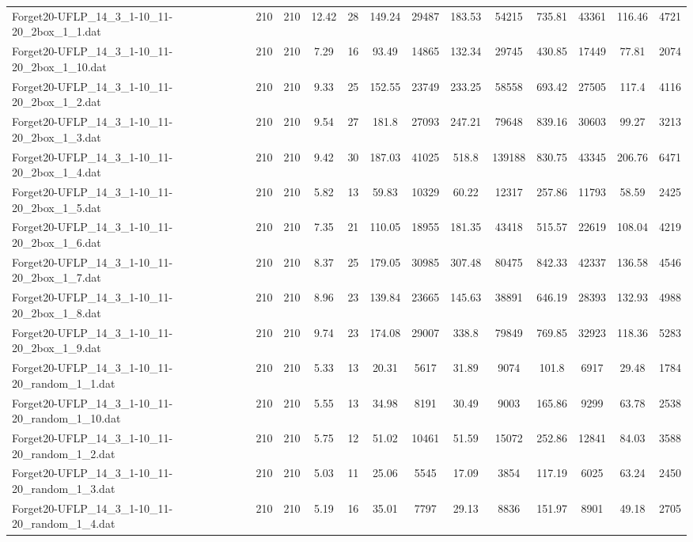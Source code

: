 \begin{table}[!ht]
{\begin{tabular}{lcccccccccccc}
Forget20-UFLP\_14\_3\_1-10\_11-20\_2box\_1\_1.dat & 210 & 210 & 12.42 & 28 & 149.24 & 29487 & 183.53 & 54215 & 735.81 & 43361 & 116.46 & 4721 \\
Forget20-UFLP\_14\_3\_1-10\_11-20\_2box\_1\_10.dat & 210 & 210 & 7.29 & 16 & 93.49 & 14865 & 132.34 & 29745 & 430.85 & 17449 & 77.81 & 2074 \\
Forget20-UFLP\_14\_3\_1-10\_11-20\_2box\_1\_2.dat & 210 & 210 & 9.33 & 25 & 152.55 & 23749 & 233.25 & 58558 & 693.42 & 27505 & 117.4 & 4116 \\
Forget20-UFLP\_14\_3\_1-10\_11-20\_2box\_1\_3.dat & 210 & 210 & 9.54 & 27 & 181.8 & 27093 & 247.21 & 79648 & 839.16 & 30603 & 99.27 & 3213 \\
Forget20-UFLP\_14\_3\_1-10\_11-20\_2box\_1\_4.dat & 210 & 210 & 9.42 & 30 & 187.03 & 41025 & 518.8 & 139188 & 830.75 & 43345 & 206.76 & 6471 \\
Forget20-UFLP\_14\_3\_1-10\_11-20\_2box\_1\_5.dat & 210 & 210 & 5.82 & 13 & 59.83 & 10329 & 60.22 & 12317 & 257.86 & 11793 & 58.59 & 2425 \\
Forget20-UFLP\_14\_3\_1-10\_11-20\_2box\_1\_6.dat & 210 & 210 & 7.35 & 21 & 110.05 & 18955 & 181.35 & 43418 & 515.57 & 22619 & 108.04 & 4219 \\
Forget20-UFLP\_14\_3\_1-10\_11-20\_2box\_1\_7.dat & 210 & 210 & 8.37 & 25 & 179.05 & 30985 & 307.48 & 80475 & 842.33 & 42337 & 136.58 & 4546 \\
Forget20-UFLP\_14\_3\_1-10\_11-20\_2box\_1\_8.dat & 210 & 210 & 8.96 & 23 & 139.84 & 23665 & 145.63 & 38891 & 646.19 & 28393 & 132.93 & 4988 \\
Forget20-UFLP\_14\_3\_1-10\_11-20\_2box\_1\_9.dat & 210 & 210 & 9.74 & 23 & 174.08 & 29007 & 338.8 & 79849 & 769.85 & 32923 & 118.36 & 5283 \\
Forget20-UFLP\_14\_3\_1-10\_11-20\_random\_1\_1.dat & 210 & 210 & 5.33 & 13 & 20.31 & 5617 & 31.89 & 9074 & 101.8 & 6917 & 29.48 & 1784 \\
Forget20-UFLP\_14\_3\_1-10\_11-20\_random\_1\_10.dat & 210 & 210 & 5.55 & 13 & 34.98 & 8191 & 30.49 & 9003 & 165.86 & 9299 & 63.78 & 2538 \\
Forget20-UFLP\_14\_3\_1-10\_11-20\_random\_1\_2.dat & 210 & 210 & 5.75 & 12 & 51.02 & 10461 & 51.59 & 15072 & 252.86 & 12841 & 84.03 & 3588 \\
Forget20-UFLP\_14\_3\_1-10\_11-20\_random\_1\_3.dat & 210 & 210 & 5.03 & 11 & 25.06 & 5545 & 17.09 & 3854 & 117.19 & 6025 & 63.24 & 2450 \\
Forget20-UFLP\_14\_3\_1-10\_11-20\_random\_1\_4.dat & 210 & 210 & 5.19 & 16 & 35.01 & 7797 & 29.13 & 8836 & 151.97 & 8901 & 49.18 & 2705 \\

\end{tabular}}
\end{table}
